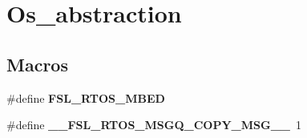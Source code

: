 \hypertarget{group__os__abstraction}{}\section{Os\+\_\+abstraction}
\label{group__os__abstraction}
\subsection*{Macros}
\begin{DoxyCompactItemize}
\item 
\#define {\bfseries F\+S\+L\+\_\+\+R\+T\+O\+S\+\_\+\+M\+B\+ED}\hypertarget{group__os__abstraction_ga22719853ad1918ddd7d9e23d6847d84e}{}\label{group__os__abstraction_ga22719853ad1918ddd7d9e23d6847d84e}

\item 
\#define {\bfseries \+\_\+\+\_\+\+F\+S\+L\+\_\+\+R\+T\+O\+S\+\_\+\+M\+S\+G\+Q\+\_\+\+C\+O\+P\+Y\+\_\+\+M\+S\+G\+\_\+\+\_\+}~1\hypertarget{group__os__abstraction_gacec7c83cf666baf4495e3ca4e99c0569}{}\label{group__os__abstraction_gacec7c83cf666baf4495e3ca4e99c0569}

\end{DoxyCompactItemize}
